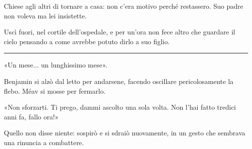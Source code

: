 Chiese agli altri di tornare a casa: non c'era motivo perché restassero. Suo padre non voleva ma lei
insistette.

Uscì fuori, nel cortile dell'ospedale, e per un'ora non fece altro che guardare il cielo pensando a
come avrebbe potuto dirlo a suo figlio.

\plainbreak{1}

«Un mese... un lunghissimo mese».

Benjamin si alzò dal letto per andarsene, facendo oscillare pericolosamente la flebo. Méav si mosse
per fermarlo.

«Non sforzarti. Ti prego, dammi ascolto una sola volta. Non l’hai fatto tredici anni fa, fallo ora!»

Quello non disse niente: sospirò e si sdraiò nuovamente, in un gesto che sembrava una rinuncia a
combattere.
